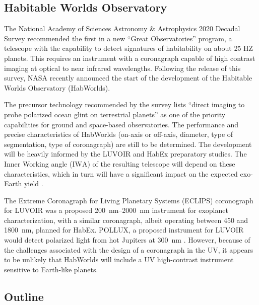 \documentclass[
    usenatbib,
]{mnras}
\newcommand{\IWA}{\ensuremath{\mathrm{IWA}}}
\newcommand{\hwo}{HabWorlds}
\begin{document}
\subsection{Habitable Worlds Observatory}

The National Academy of Sciences Astronomy \& Astrophysics 2020 Decadal Survey \citep{decadal} recommended the first in a new \enquote{Great Observatories} program, a telescope with the capability to detect signatures of habitability on about 25 HZ planets.
%
This requires an instrument with a coronagraph capable of high contrast imaging at optical to near infrared wavelengths.
%
Following the release of this survey, NASA recently announced the start of the development of the Habitable Worlds Observatory (\hwo).
%

The precursor technology recommended by the survey lists \enquote{direct imaging to probe polarized ocean glint on terrestrial planets} as one of the priority capabilities \citep[Box E.1 in][]{decadal} for ground and space-based observatories.
%
The performance and precise characteristics of \hwo{} (on-axis or off-axis, diameter, type of segmentation, type of coronagraph) are still to be determined.
%
The development will be heavily informed by the LUVOIR \citep{LUVOIR2019} and HabEx \citep{HabEx_2020} preparatory studies.
%
The Inner Working angle (\IWA{}) of the resulting telescope will depend on these characteristics, which in turn will have a significant impact on the expected exo-Earth yield \citep{Stark2019_exoplanetyield}.

The Extreme Coronagraph for Living Planetary Systems (ECLIPS) coronograph for LUVOIR was a proposed \qtyrange{200}{2000}{\nano\meter} instrument for exoplanet characterization, with a similar coronagraph, albeit operating between \num{450} and \qty{1800}{\nano\meter}, planned for HabEx.
%
POLLUX, a proposed instrument for LUVOIR would detect polarized light from hot Jupiters at \qty{300}{\nano\meter} \citep{Bouret2018_pollux}.
%
However, because of the challenges associated with the design of a coronagraph in the UV, it appears to be unlikely that \hwo{} will include a UV high-contrast instrument sensitive to Earth-like planets.


\subsection{Outline}
\end{document}
